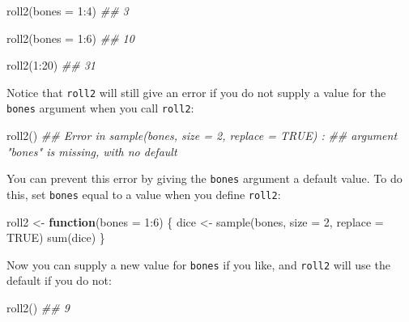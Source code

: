 \documentclass[
  letterpaper,
  DIV=11,
  numbers=noendperiod]{scrbook}
\newenvironment{Shaded}{\begin{snugshade}}{\end{snugshade}}
\newcommand{\AttributeTok}[1]{\textcolor[rgb]{0.40,0.45,0.13}{#1}}
\newcommand{\ConstantTok}[1]{\textcolor[rgb]{0.56,0.35,0.01}{#1}}
\newcommand{\ControlFlowTok}[1]{\textcolor[rgb]{0.00,0.23,0.31}{\textbf{#1}}}
\newcommand{\DecValTok}[1]{\textcolor[rgb]{0.68,0.00,0.00}{#1}}
\newcommand{\DocumentationTok}[1]{\textcolor[rgb]{0.37,0.37,0.37}{\textit{#1}}}
\newcommand{\FunctionTok}[1]{\textcolor[rgb]{0.28,0.35,0.67}{#1}}
\newcommand{\NormalTok}[1]{\textcolor[rgb]{0.00,0.23,0.31}{#1}}
\newcommand{\OtherTok}[1]{\textcolor[rgb]{0.00,0.23,0.31}{#1}}
\newcommand{\SpecialCharTok}[1]{\textcolor[rgb]{0.37,0.37,0.37}{#1}}
\begin{document}
\begin{Shaded}
\begin{Highlighting}[]
\FunctionTok{roll2}\NormalTok{(}\AttributeTok{bones =} \DecValTok{1}\SpecialCharTok{:}\DecValTok{4}\NormalTok{)}
\DocumentationTok{\#\#  3}

\FunctionTok{roll2}\NormalTok{(}\AttributeTok{bones =} \DecValTok{1}\SpecialCharTok{:}\DecValTok{6}\NormalTok{)}
\DocumentationTok{\#\# 10}

\FunctionTok{roll2}\NormalTok{(}\DecValTok{1}\SpecialCharTok{:}\DecValTok{20}\NormalTok{)}
\DocumentationTok{\#\# 31}
\end{Highlighting}
\end{Shaded}

Notice that \texttt{roll2} will still give an error if you do not supply
a value for the \texttt{bones} argument when you call \texttt{roll2}:

\begin{Shaded}
\begin{Highlighting}[]
\FunctionTok{roll2}\NormalTok{()}
\DocumentationTok{\#\# Error in sample(bones, size = 2, replace = TRUE) : }
\DocumentationTok{\#\#   argument "bones" is missing, with no default}
\end{Highlighting}
\end{Shaded}

You can prevent this error by giving the \texttt{bones} argument a
default value. To do this, set \texttt{bones} equal to a value when you
define \texttt{roll2}:

\begin{Shaded}
\begin{Highlighting}[]
\NormalTok{roll2 }\OtherTok{\textless{}{-}} \ControlFlowTok{function}\NormalTok{(}\AttributeTok{bones =} \DecValTok{1}\SpecialCharTok{:}\DecValTok{6}\NormalTok{) \{}
\NormalTok{  dice }\OtherTok{\textless{}{-}} \FunctionTok{sample}\NormalTok{(bones, }\AttributeTok{size =} \DecValTok{2}\NormalTok{, }\AttributeTok{replace =} \ConstantTok{TRUE}\NormalTok{)}
  \FunctionTok{sum}\NormalTok{(dice)}
\NormalTok{\}}
\end{Highlighting}
\end{Shaded}

Now you can supply a new value for \texttt{bones} if you like, and
\texttt{roll2} will use the default if you do not:

\begin{Shaded}
\begin{Highlighting}[]
\FunctionTok{roll2}\NormalTok{()}
\DocumentationTok{\#\# 9}
\end{Highlighting}
\end{Shaded}
\end{document}
